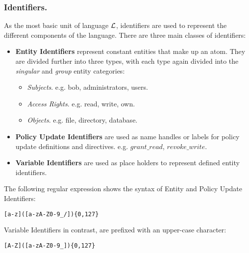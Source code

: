 \documentclass[11pt]{llncs}
\begin{document}
      \subsubsection{Identifiers.}

        As the most basic unit of language ${\cal L}$, identifiers are used to
        represent the different components of the language. There are three
        main classes of identifiers:

        \begin{itemize}
          \item
            {\bf Entity Identifiers} represent constant entities that make
            up an atom. They are divided further into three types, with each
            type again divided into the {\em singular} and {\em group} entity
            categories:
 
            \begin{itemize}
              \item
                {\em Subjects}. e.g. bob, administrators, users.
              \item
                {\em Access Rights}. e.g. read, write, own.
              \item
                {\em Objects}. e.g. file, directory, database.
            \end{itemize}
          \vspace{1mm}
          \item
            {\bf Policy Update Identifiers} are used as name handles or labels
            for policy update definitions and directives. e.g. $grant\_read$,
            $revoke\_write$.
 
          \vspace{1mm}
          \item
            {\bf Variable Identifiers} are used as place holders to represent
            defined entity identifiers.
        \end{itemize}
 
        The following regular expression shows the syntax of Entity and
        Policy Update Identifiers:
 
        \begin{verbatim}[a-z]([a-zA-Z0-9_/]){0,127}\end{verbatim}
 
        Variable Identifiers in contrast, are prefixed with an upper-case
        character:
 
        \begin{verbatim}[A-Z]([a-zA-Z0-9_]){0,127}\end{verbatim}
\end{document}
